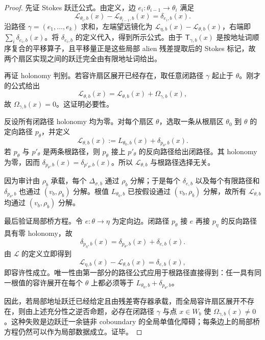 \begin{proof}
先证 Stokes 跃迁公式。由定义，边 \(e_i:\theta_{i-1}\to\theta_i\) 满足
\[
\mathcal L_{\theta_i,b}(x)-\mathcal L_{\theta_{i-1},b}(x)=\delta_{e_i,b}(x).
\]
沿路径 \(\gamma=(e_1,\ldots,e_k)\) 求和，左端望远镜化为
\(\mathcal L_{\eta,b}(x)-\mathcal L_{\theta,b}(x)\)，右端即
\(\sum_i\delta_{e_i,b}(x)\)。将 \(\delta_{e_i,b}\) 的定义代入，得到所示公式。由于
\(\mathsf T_{\gamma,b}(x)\) 是按地址词顺序复合的平移算子，且平移量正是这些局部 alien 残差提取后的 Stokes 标记，故两个扇区实现之间的跃迁完全由有限地址词给出。

再证 holonomy 判别。若容许扇区展开已经存在，取任意闭路径
\(\gamma\) 起止于 \(\theta\)。刚才的公式给出
\[
\mathcal L_{\theta,b}(x)=\mathcal L_{\theta,b}(x)+\Omega_{\gamma,b}(x),
\]
故 \(\Omega_{\gamma,b}(x)=0\)。这证明必要性。

反设所有闭路径 holonomy 均为零。对每个扇区 \(\theta\)，选取一条从根扇区 \(\theta_0\) 到 \(\theta\) 的定向路径 \(p_\theta\)，并定义
\[
\mathcal L_{\theta,b}(x):=L_{\theta_0,b}(x)+\delta_{p_\theta,b}(x).
\]
若 \(p_\theta\) 与 \(p'_\theta\) 是两条根路径，则
\(p_\theta\) 接上 \(p'_\theta\) 的反向路径给出闭路径。其 holonomy 为零，因而
\(\delta_{p_\theta,b}(x)=\delta_{p'_\theta,b}(x)\)。所以 \(\mathcal L_{\theta,b}\) 与根路径选择无关。

因为审计由 \(\rho_b\) 承载，每个 \(\Delta_{\sigma,b}\) 通过 \(\rho_b\) 分解；于是每个
\(\delta_{e,b}\) 以及每个有限路径和 \(\delta_{p_\theta,b}\) 也通过 \((v_b,\rho_b)\) 分解。根值
\(L_{\theta_0,b}\) 已按假设通过 \((v_b,\rho_b)\) 分解，故所有
\(\mathcal L_{\theta,b}\) 均通过 \((v_b,\rho_b)\) 分解。

最后验证局部桥方程。令 \(e:\theta\to\eta\) 为定向边。闭路径
\(p_\theta\) 接 \(e\) 再接 \(p_\eta\) 的反向路径具有零 holonomy，故
\[
\delta_{p_\eta,b}(x)=\delta_{p_\theta,b}(x)+\delta_{e,b}(x).
\]
由 \(\mathcal L\) 的定义立即得到
\[
\mathcal L_{\eta,b}(x)-\mathcal L_{\theta,b}(x)=\delta_{e,b}(x),
\]
即容许性成立。唯一性由第一部分的路径公式应用于根路径直接得到：任一具有同一根值的容许展开在每个 \(\theta\) 上都必须等于
\(L_{\theta_0,b}+\delta_{p_\theta,b}\)。

因此，若局部地址跃迁已经给定且由残差寄存器承载，而全局容许扇区展开不存在，则由上述充分性之逆否命题，必存在闭路径 \(\gamma\) 与点 \(x\in W_b\) 使
\(\Omega_{\gamma,b}(x)\ne0\)。这种失败是边跃迁一余链非 coboundary 的全局单值化障碍；每条边上的局部桥方程仍然可以作为局部数据成立。证毕。
\end{proof}

